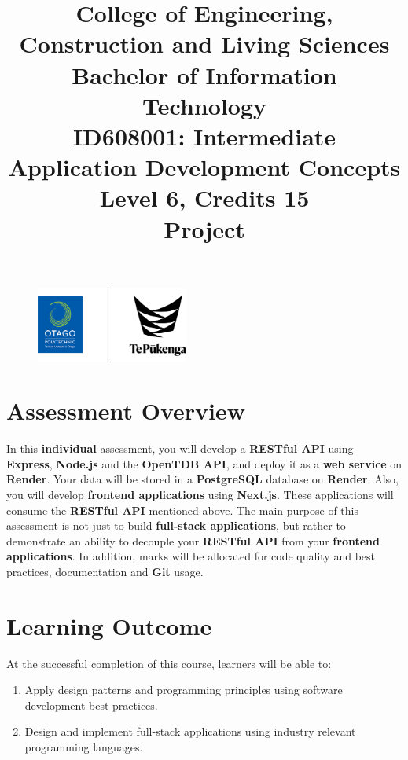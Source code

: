 \documentclass{article}
\author{}
\begin{document}
\begin{figure}
	\centering
	\includegraphics[width=50mm]{../../resources/img/logo.png}
\end{figure}

\title{College of Engineering, Construction and Living Sciences\\Bachelor of Information Technology\\ID608001: Intermediate Application Development Concepts\\Level 6, Credits 15\\\textbf{Project}}
\date{}
\maketitle

\section*{Assessment Overview}
In this \textbf{individual} assessment, you will develop a \textbf{RESTful API} using \textbf{Express}, \textbf{Node.js} and the \textbf{OpenTDB API}, and deploy it as a \textbf{web service} on \textbf{Render}. Your data will be stored in a \textbf{PostgreSQL} database on \textbf{Render}. Also, you will develop \textbf{frontend applications} using \textbf{Next.js}. These applications will consume the \textbf{RESTful API} mentioned above. The main purpose of this assessment is not just to build \textbf{full-stack applications}, but rather to demonstrate an ability to decouple your \textbf{RESTful API} from your \textbf{frontend applications}. In addition, marks will be allocated for code quality and best practices, documentation and \textbf{Git} usage.

\section*{Learning Outcome}
At the successful completion of this course, learners will be able to:
\begin{enumerate}
	\item Apply design patterns and programming principles using software development best practices.
	\item Design and implement full-stack applications using industry relevant programming languages.
\end{enumerate}
\end{document}
